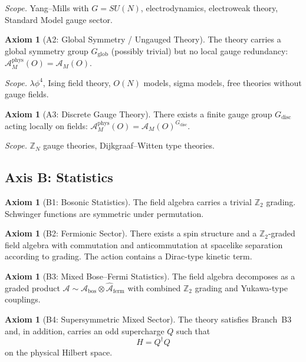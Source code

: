 \documentclass[12pt,a4paper]{article}
\theoremstyle{plain}
\theoremstyle{definition}
\newtheorem{axiom}[theorem]{Axiom}
\theoremstyle{remark}
\newcommand{\alg}{\mathcal{A}}
\begin{document}
\emph{Scope.} Yang--Mills with $G = SU(N)$, electrodynamics,
electroweak theory, Standard Model gauge sector.

\begin{axiom}[A2: Global Symmetry / Ungauged Theory]\label{ax:A2}
  The theory carries a global symmetry group $G_{\mathrm{glob}}$
  (possibly trivial) but no local gauge redundancy:
  $\alg^{\mathrm{phys}}_M(O) = \alg_M(O)$.
\end{axiom}

\emph{Scope.} $\lambda\phi^4$, Ising field theory, $O(N)$ models,
sigma models, free theories without gauge fields.

\begin{axiom}[A3: Discrete Gauge Theory]\label{ax:A3}
  There exists a finite gauge group $G_{\mathrm{disc}}$ acting locally
  on fields:
  $\alg^{\mathrm{phys}}_M(O) = \alg_M(O)^{G_{\mathrm{disc}}}$.
\end{axiom}

\emph{Scope.} $\mathbb{Z}_N$ gauge theories, Dijkgraaf--Witten type
theories.


\subsection{Axis B: Statistics}

\begin{axiom}[B1: Bosonic Statistics]\label{ax:B1}
  The field algebra carries a trivial $\mathbb{Z}_2$ grading.
  Schwinger functions are symmetric under permutation.
\end{axiom}

\begin{axiom}[B2: Fermionic Sector]\label{ax:B2}
  There exists a spin structure and a $\mathbb{Z}_2$-graded field
  algebra with commutation and anticommutation at spacelike separation
  according to grading. The action contains a Dirac-type kinetic term.
\end{axiom}

\begin{axiom}[B3: Mixed Bose--Fermi Statistics]\label{ax:B3}
  The field algebra decomposes as a graded product
  $\alg \sim \alg_{\mathrm{bos}} \otimes \widehat{\alg}_{\mathrm{ferm}}$
  with combined $\mathbb{Z}_2$ grading and Yukawa-type couplings.
\end{axiom}

\begin{axiom}[B4: Supersymmetric Mixed Sector]\label{ax:B4}
  The theory satisfies Branch~B3 and, in addition, carries an odd
  supercharge $Q$ such that
  \begin{equation}\label{eq:susy}
    H = Q^\dagger Q
  \end{equation}
  on the physical Hilbert space.
\end{axiom}
\end{document}
